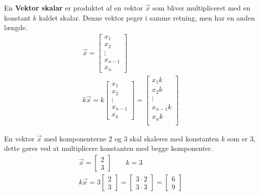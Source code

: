 \begin{defn}
En \textbf{Vektor skalar} er produktet af en vektor $\vec{x}$
som bliver multipliceret med en konstant $k$ kaldet skalar. Denne vektor peger i samme retning, men har en anden længde.
\begin{align*}
\vec{x}=\begin{bmatrix}
x_1\\
x_2\\
\vdots\\
x_{n-1}\\
x_n
\end{bmatrix}\\
k\vec{x}=k\begin{bmatrix}
x_1\\
x_2\\
\vdots\\
x_{n-1}\\
x_k
\end{bmatrix}=
\begin{bmatrix}
x_1k\\
x_2k\\
\vdots\\
x_{n-1}k\\
x_nk\\
\end{bmatrix}
\end{align*}
\end{defn}
\begin{eks}
En vektor $\vec{x}$ med komponenterne $2$ og $3$ skal skaleres med konstanten $k$ som er $3$, dette gøres ved at multiplicere konstanten med begge komponenter.
\begin{align*}
\vec{x}=\begin{bmatrix}
2\\
3
\end{bmatrix}\qquad k=3\\
k\vec{x}=3
\begin{bmatrix}
2\\
3
\end{bmatrix}
=
\begin{bmatrix}
3\cdot2\\
3\cdot3
\end{bmatrix}
=
\begin{bmatrix}
6\\
9
\end{bmatrix}
\end{align*}
\end{eks}
